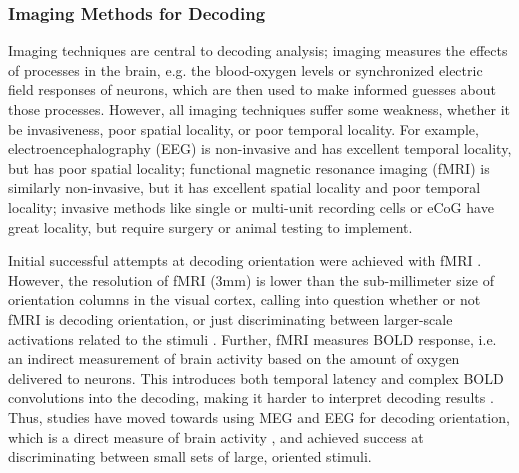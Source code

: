 \documentclass[../main.tex]{subfiles}
\begin{document}
\subsubsection{Imaging Methods for Decoding}
Imaging techniques are central to decoding analysis; imaging measures the effects of processes in the brain, e.g. the blood-oxygen levels or synchronized electric field responses of neurons, which are then used to make informed guesses about those processes. However, all imaging techniques suffer some weakness, whether it be invasiveness, poor spatial locality, or poor temporal locality. For example, electroencephalography (EEG) is non-invasive and has excellent temporal locality, but has poor spatial locality; functional magnetic resonance imaging (fMRI) is similarly non-invasive, but it has excellent spatial locality and poor temporal locality; invasive methods like single or multi-unit recording cells or eCoG have great locality, but require surgery or animal testing to implement.

Initial successful attempts at decoding orientation were achieved with fMRI \citep{haynes_rees_2005, kamitani_tong_2005}. However, the resolution of fMRI (3mm) is lower than the sub-millimeter size of orientation columns in the visual cortex, calling into question whether or not fMRI is decoding orientation, or just discriminating between larger-scale activations related to the stimuli \citep{cichy_ramirez_pantazis_2015}. Further, fMRI measures BOLD response, i.e. an indirect measurement of brain activity based on the amount of oxygen delivered to neurons. This introduces both temporal latency and complex BOLD convolutions into the decoding, making it harder to interpret decoding results \citep{cichy_ramirez_pantazis_2015}. Thus, studies have moved towards using MEG and EEG for decoding orientation, which is a direct measure of brain activity \citep{cichy_ramirez_pantazis_2015, pantazis_fang_qin_mohsenzadeh_li_cichy_2018, GARCIA2013515}, and achieved success at discriminating between small sets of large, oriented stimuli.
\end{document}
